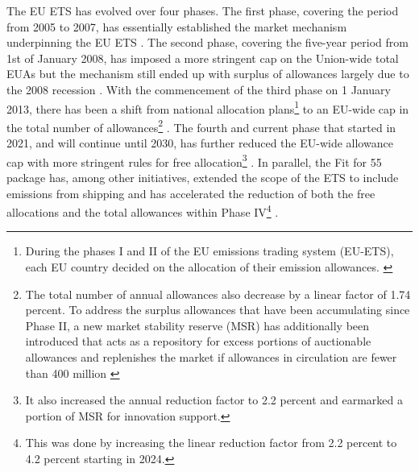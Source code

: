 \documentclass[preprint, 3p,
authoryear]{elsarticle} %
\begin{document}
The EU ETS has evolved over four phases. The first phase, covering the
period from 2005 to 2007, has essentially established the market
mechanism underpinning the EU ETS \citep[Art. 11(1)]{directive_2003_87}.
The second phase, covering the five-year period from 1st of January
2008, has imposed a more stringent cap on the Union-wide total EUAs but
the mechanism still ended up with surplus of allowances largely due to
the 2008 recession \citep{ellerman_eu_2014, bel_emission_2015}. With the
commencement of the third phase on 1 January 2013, there has been a
shift from national allocation
plans\footnote{During the phases I and II of the EU emissions trading system (EU-ETS), each EU country decided on the allocation of their emission allowances. \citep[Art. 11]{directive_2003_87}}
to an EU-wide cap in the total number of
allowances\footnote{The total number of annual allowances also decrease by a linear factor of 1.74 percent. To address the surplus allowances that have been accumulating since Phase II, a new market stability reserve (MSR) has additionally been introduced that acts as a repository for excess portions of auctionable allowances and replenishes the market if allowances in circulation are fewer than 400 million \citep{decision_2015_1814, simoes_revision_2022}}
\citep[Art. 1]{directive_2009_29}. The fourth and current phase that
started in 2021, and will continue until 2030, has further reduced the
EU-wide allowance cap with more stringent rules for free
allocation\footnote{It also increased the annual reduction factor to 2.2 percent and earmarked a portion of MSR for innovation support.}
\citep{directive_2018_410}. In parallel, the Fit for 55 package has,
among other initiatives, extended the scope of the ETS to include
emissions from shipping and has accelerated the reduction of both the
free allocations and the total allowances within Phase
IV\footnote{This was done by increasing the linear reduction factor from 2.2 percent to 4.2 percent starting in 2024.}
\citep{directive_2023_959}.
\end{document}

